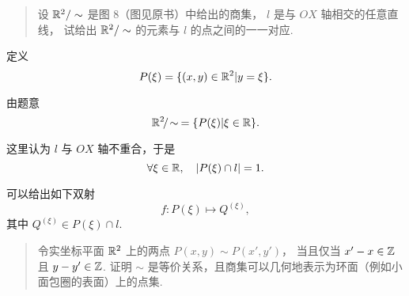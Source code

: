 \begin{quotation}
    设 $\mathbb{R}^2 / \sim$ 是图 8（图见原书）中给出的商集，
    $l$ 是与 $OX$ 轴相交的任意直线，
    试给出 $\mathbb{R}^2 / \sim$ 的元素与 $l$ 的点之间的一一对应.
\end{quotation}

定义
\begin{equation}
    P(\xi) = \{ (x, y) \in \mathbb{R}^2 | y = \xi \}.
\end{equation}

由题意
\begin{equation}
    \mathbb{R}^2\!/\!\sim \:= \{ P(\xi) | \xi \in \mathbb{R} \}.
\end{equation}

这里认为 $l$ 与 $OX$ 轴不重合，于是
\begin{equation}
    \forall \xi \in \mathbb{R}, \quad
    | P(\xi) \cap l | = 1.
\end{equation}

可以给出如下双射
\begin{equation}
    f: P(\xi) \mapsto Q^{(\xi)},
\end{equation}
其中 $Q^{(\xi)} \in P(\xi) \cap l$.


\begin{quotation}
    令实坐标平面 $\mathbb{R}^2$ 上的两点 $P(x,y) \sim P(x', y')$，
    当且仅当 $x' - x \in \mathbb{Z}$ 且 $y - y' \in \mathbb{Z}$.
    证明 $\sim$ 是等价关系，且商集可以几何地表示为环面（例如小面包圈的表面）上的点集.
\end{quotation}

